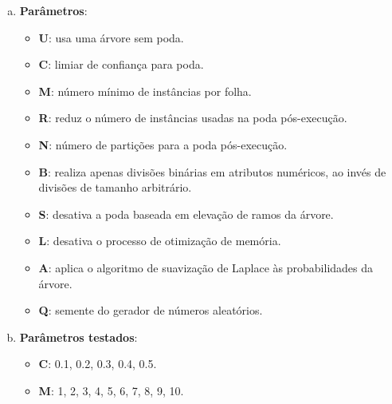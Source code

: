 \begin{enumerate}[a)]
    \item \textbf{Parâmetros}:
        \begin{itemize}

            \item \textbf{U}: usa uma árvore sem poda.

            \item \textbf{C}: limiar de confiança para poda.

            \item \textbf{M}: número mínimo de instâncias por folha.

            \item \textbf{R}: reduz o número de instâncias usadas na poda pós-execução.

            \item \textbf{N}: número de partições para a poda pós-execução.

            \item \textbf{B}: realiza apenas divisões binárias em atributos numéricos, ao invés de divisões de tamanho arbitrário.

            \item \textbf{S}: desativa a poda baseada em elevação de ramos da árvore.

            \item \textbf{L}: desativa o processo de otimização de memória.

            \item \textbf{A}: aplica o algoritmo de suavização de Laplace às probabilidades da árvore.

            \item \textbf{Q}: semente do gerador de números aleatórios.
        \end{itemize}
    \item \textbf{Parâmetros testados}:
        \begin{itemize}
            \item \textbf{C}: 0.1, 0.2, 0.3, 0.4, 0.5.
            \item \textbf{M}: 1, 2, 3, 4, 5, 6, 7, 8, 9, 10.
        \end{itemize}
\end{enumerate}

